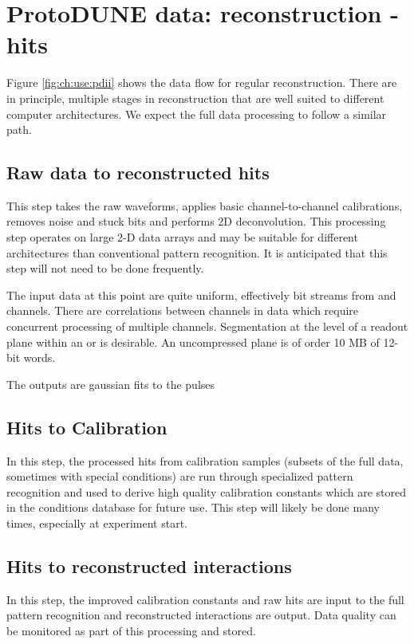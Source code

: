 \documentclass[../main-00.tex]{subfiles}
\begin{document}
\section{ProtoDUNE data: reconstruction - hits}\label{sec:use:pdii}

Figure \ref{fig:ch:use:pdii} shows the data flow for regular reconstruction.  There are in principle, multiple stages in reconstruction that are well suited to different computer architectures.  We expect the full  data processing to follow a similar path. 

\subsection{Raw data to reconstructed hits}

This step takes the raw waveforms, applies  basic channel-to-channel calibrations, removes noise and stuck bits and performs 2D deconvolution.   This processing step operates on large 2-D data arrays and may be suitable for different architectures than conventional pattern recognition. It is anticipated that this step will not need to be done frequently. 

The input data at this point are quite uniform, effectively bit streams from  and  channels.  There are correlations between channels in  data which require concurrent processing of multiple channels.  Segmentation at the level of a readout plane within an   or  is desirable.  An uncompressed  plane is of order 10 MB of 12-bit words. 

The outputs are gaussian fits to the pulses 



\subsection{Hits to Calibration}

In this step, the processed hits from calibration samples (subsets of the full data, sometimes with special conditions) are run through specialized pattern recognition and used to derive high quality calibration constants which are stored in the conditions database for future use.   This step will likely be done many times, especially at experiment start.

\subsection{Hits to reconstructed interactions }
In this step, the improved calibration constants and raw hits are input to the full  pattern recognition and reconstructed interactions are output. Data quality can be monitored as part of this processing and stored. 
\end{document}
